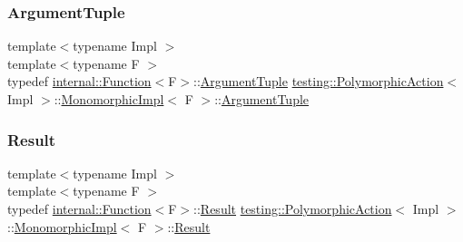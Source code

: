 \mbox{\label{classtesting_1_1_polymorphic_action_1_1_monomorphic_impl_a2d6ef64336f1d5cdac893fb040048c8c}} 
\subsubsection{\texorpdfstring{ArgumentTuple}{ArgumentTuple}\hspace{0.1cm}{\footnotesize\ttfamily [3/3]}}
{\footnotesize\ttfamily template$<$typename Impl $>$ \\
template$<$typename F $>$ \\
typedef \mbox{\hyperlink{structtesting_1_1internal_1_1_function}{internal\+::\+Function}}$<$F$>$\+::\mbox{\hyperlink{classtesting_1_1_action_interface_af72720d864da4d606629e83edc003511}{Argument\+Tuple}} \mbox{\hyperlink{classtesting_1_1_polymorphic_action}{testing\+::\+Polymorphic\+Action}}$<$ Impl $>$\+::\mbox{\hyperlink{classtesting_1_1_polymorphic_action_1_1_monomorphic_impl}{Monomorphic\+Impl}}$<$ F $>$\+::\mbox{\hyperlink{classtesting_1_1_action_interface_af72720d864da4d606629e83edc003511}{Argument\+Tuple}}}

\mbox{\label{classtesting_1_1_polymorphic_action_1_1_monomorphic_impl_a7989da669c4c7a2da978ed78743815cb}} 
\subsubsection{\texorpdfstring{Result}{Result}\hspace{0.1cm}{\footnotesize\ttfamily [1/3]}}
{\footnotesize\ttfamily template$<$typename Impl $>$ \\
template$<$typename F $>$ \\
typedef \mbox{\hyperlink{structtesting_1_1internal_1_1_function}{internal\+::\+Function}}$<$F$>$\+::\mbox{\hyperlink{classtesting_1_1_action_interface_a7477de2fe3e4e01c59db698203acaee7}{Result}} \mbox{\hyperlink{classtesting_1_1_polymorphic_action}{testing\+::\+Polymorphic\+Action}}$<$ Impl $>$\+::\mbox{\hyperlink{classtesting_1_1_polymorphic_action_1_1_monomorphic_impl}{Monomorphic\+Impl}}$<$ F $>$\+::\mbox{\hyperlink{classtesting_1_1_action_interface_a7477de2fe3e4e01c59db698203acaee7}{Result}}}

